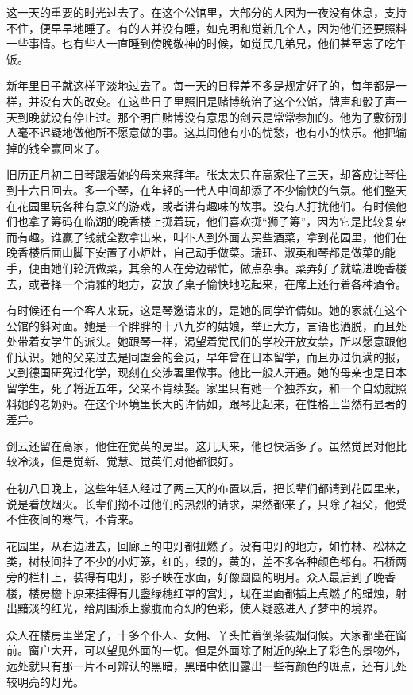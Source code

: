 \par 这一天的重要的时光过去了。在这个公馆里，大部分的人因为一夜没有休息，支持不住，便早早地睡了。有的人并没有睡，如克明和觉新几个人，因为他们还要照料一些事情。也有些人一直睡到傍晚敬神的时候，如觉民几弟兄，他们甚至忘了吃午饭。
\par 新年里日子就这样平淡地过去了。每一天的日程差不多是规定好了的，每年都是一样，并没有大的改变。在这些日子里照旧是赌博统治了这个公馆，牌声和骰子声一天到晚就没有停止过。那个明白赌博没有意思的剑云是常常参加的。他为了敷衍别人毫不迟疑地做他所不愿意做的事。这其间他有小的忧愁，也有小的快乐。他把输掉的钱全赢回来了。
\par 旧历正月初二日琴跟着她的母亲来拜年。张太太只在高家住了三天，却答应让琴住到十六日回去。多一个琴，在年轻的一代人中间却添了不少愉快的气氛。他们整天在花园里玩各种有意义的游戏，或者讲有趣味的故事。没有人打扰他们。有时候他们也拿了筹码在临湖的晚香楼上掷着玩，他们喜欢掷“狮子筹”，因为它是比较复杂而有趣。谁赢了钱就全数拿出来，叫仆人到外面去买些酒菜，拿到花园里，他们在晚香楼后面山脚下安置了小炉灶，自己动手做菜。瑞珏、淑英和琴都是做菜的能手，便由她们轮流做菜，其余的人在旁边帮忙，做点杂事。菜弄好了就端进晚香楼去，或者择一个清雅的地方，安放了桌子愉快地吃起来，在席上还行着各种酒令。
\par 有时候还有一个客人来玩，这是琴邀请来的，是她的同学许倩如。她的家就在这个公馆的斜对面。她是一个胖胖的十八九岁的姑娘，举止大方，言语也洒脱，而且处处带着女学生的派头。她跟琴一样，渴望着觉民们的学校开放女禁，所以愿意跟他们认识。她的父亲过去是同盟会的会员，早年曾在日本留学，而且办过仇满的报，又到德国研究过化学，现刻在交涉署里做事。他比一般人开通。她的母亲也是日本留学生，死了将近五年，父亲不肯续娶。家里只有她一个独养女，和一个自幼就照料她的老奶妈。在这个环境里长大的许倩如，跟琴比起来，在性格上当然有显著的差异。
\par 剑云还留在高家，他住在觉英的房里。这几天来，他也快活多了。虽然觉民对他比较冷淡，但是觉新、觉慧、觉英们对他都很好。
\par 在初八日晚上，这些年轻人经过了两三天的布置以后，把长辈们都请到花园里来，说是看放烟火。长辈们拗不过他们的热烈的请求，果然都来了，只除了祖父，他受不住夜间的寒气，不肯来。
\par 花园里，从右边进去，回廊上的电灯都扭燃了。没有电灯的地方，如竹林、松林之类，树枝间挂了不少的小灯笼，红的，绿的，黄的，差不多各种颜色都有。石桥两旁的栏杆上，装得有电灯，影子映在水面，好像圆圆的明月。众人最后到了晚香楼，楼房檐下原来挂得有几盏绿穗红罩的宫灯，现在里面都插上点燃了的蜡烛，射出黯淡的红光，给周围添上朦胧而奇幻的色彩，使人疑惑进入了梦中的境界。
\par 众人在楼房里坐定了，十多个仆人、女佣、丫头忙着倒茶装烟伺候。大家都坐在窗前。窗户大开，可以望见外面的一切。但是外面除了附近的染上了彩色的景物外，远处就只有那一片不可辨认的黑暗，黑暗中依旧露出一些有颜色的斑点，还有几处较明亮的灯光。
